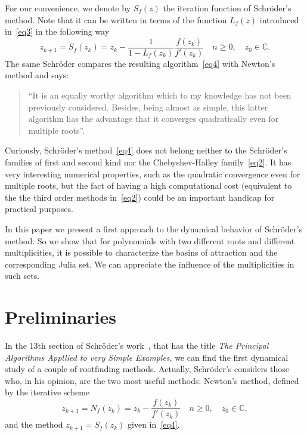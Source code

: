 \documentclass[10pt,a4paper]{article}
\begin{document}
For our convenience, we denote by $S_f(z)$ the iteration function of Schr\"oder's method. Note that it can be written in terms of the function $L_f(z)$ introduced in~\eqref{eq3} in the following way
 \begin{equation}\label{eq4}
z_{k+1}=S_f(z_k)=z_k-\frac{1}{1-L_f(z_k)}\frac{f(z_k)}{f'(z_k)} \quad n\ge 0, \quad z_0\in\mathbb{C}.
\end{equation}
The same Schr\"oder compares the resulting algorithm~\eqref{eq4} with Newton's method and says: 
\begin{quote}
``It is an equally worthy algorithm which to my knowledge has not been previously considered. Besides, being almost as simple, this latter algorithm has the advantage that it converges quadratically even for multiple roots''.
\end{quote}

Curiously, Schr\"oder's method~\eqref{eq4} does not belong neither to the Schr\"oder's families of first and second kind nor the Chebyshev-Halley family~\eqref{eq2}. It has very interesting numerical properties, such as the quadratic convergence even for multiple roots, but the fact of having a high computational cost (equivalent to the the third order methods in~\eqref{eq2}) could be an important handicap for practical purposes.

In this paper we present a first  approach to the dynamical behavior of Schr\"oder's method. So we show that for polynomials with two different roots and different multiplicities, it is possible to characterize the basins of attraction and the corresponding Julia set. We can appreciate the influence of the multiplicities in such sets.

\section{Preliminaries}

In the 13th section of Schr\"oder's work~\cite{Sch}, that has the title \emph{The Principal Algorithms Appllied to very Simple Examples}, we can find the first dynamical study of a couple of rootfinding methods. Actually, Schr\"oder's considers those who, in his opinion, are the two most useful methods: Newton's method, defined by the iterative scheme
\begin{equation}\label{eq5}
z_{k+1}=N_f(z_k)=z_k-\frac{f(z_k)}{f'(z_k)} \quad n\ge 0, \quad z_0\in\mathbb{C},
\end{equation}
and the method $z_{k+1}=S_f(z_k)$ given in~\eqref{eq4}.
\end{document}
